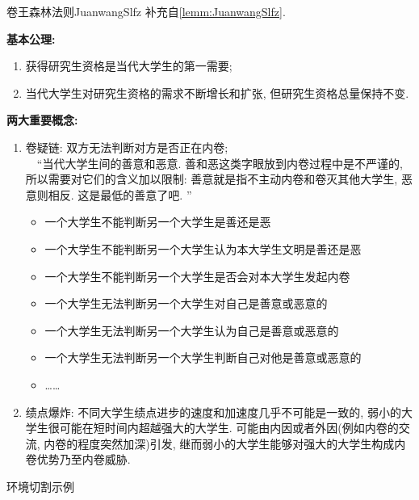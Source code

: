 \documentclass[hyperref,UTF8,11pt,CJK]{beamer}
\begin{document}
\begin{lrbox}{\mysavebox}
	\begin{scuremark}{卷王森林法则}{JuanwangSlfz}
		补充自\vref{lemm:JuanwangSlfz}.\par
		\textbf{\color{JXred}基本公理:}
		\begin{enumerate}
			\item 获得研究生资格是当代大学生的第一需要;
			\item 当代大学生对研究生资格的需求不断增长和扩张, 但研究生资格总量保持不变.
		\end{enumerate}
		\textbf{\color{JXred}两大重要概念:}
		\begin{enumerate}
			\item 卷疑链: 双方无法判断对方是否正在内卷;\\
			~~“当代大学生间的善意和恶意. 善和恶这类字眼放到内卷过程中是不严谨的, 所以需要对它们的含义加以限制: 善意就是指不主动内卷和卷灭其他大学生, 恶意则相反. 这是最低的善意了吧. ”
			\begin{itemize}
				\item 一个大学生不能判断另一个大学生是善还是恶
				\item 一个大学生不能判断另一个大学生认为本大学生文明是善还是恶
				\item 一个大学生不能判断另一个大学生是否会对本大学生发起内卷
				\item 一个大学生无法判断另一个大学生对自己是善意或恶意的
				\item 一个大学生无法判断另一个大学生认为自己是善意或恶意的
				\item 一个大学生无法判断另一个大学生判断自己对他是善意或恶意的
				\item \dots\dots
			\end{itemize}	
			\item 绩点爆炸: 不同大学生绩点进步的速度和加速度几乎不可能是一致的, 弱小的大学生很可能在短时间内超越强大的大学生. 可能由内因或者外因(例如内卷的交流, 内卷的程度突然加深)引发, 继而弱小的大学生能够对强大的大学生构成内卷优势乃至内卷威胁.
		\end{enumerate}
	\end{scuremark}
\end{lrbox}
\begin{frame}{环境切割示例}
\end{frame}
\end{document}
